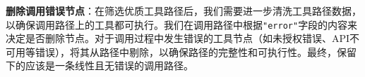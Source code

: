 \textbf{删除调用错误节点}：在筛选优质工具路径后，我们需要进一步清洗工具路径数据，以确保调用路径上的工具都可执行。我们在调用路径中根据\texttt{"error"}字段的内容来决定是否删除节点。对于调用过程中发生错误的工具节点（如未授权错误、API不可用等错误），将其从路径中剔除，以确保路径的完整性和可执行性。最终，保留下的应该是一条线性且无错误的调用路径。









